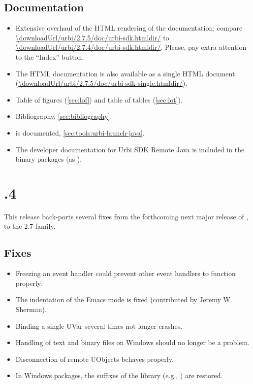 \subsection{Documentation}
\begin{itemize}
\item Extensive overhaul of the HTML rendering of the documentation; compare
  \url{\downloadUrl/urbi/2.7.5/doc/urbi-sdk.htmldir/} to
  \url{\downloadUrl/urbi/2.7.4/doc/urbi-sdk.htmldir/}.  Please, pay extra
  attention to the ``Index'' button.
\item The HTML documentation is also available as a single HTML document
  (\url{\downloadUrl/urbi/2.7.5/doc/urbi-sdk-single.htmldir/}).
\item Table of figures (\autoref{sec:lof}) and table of tables
  (\autoref{sec:lot}).
\item Bibliography, \autoref{sec:bibliography}.
\item {} is documented,
  \autoref{sec:tools:urbi-launch-java}.
\item The developer documentation for Urbi SDK Remote Java is included in
  the binary packages (as
  ).
\end{itemize}

\section{.4}

This release back-ports several fixes from the forthcoming next major
release of \urbi, to the 2.7 family.

\subsection{Fixes}
\begin{itemize}
\item Freezing an event handler could prevent other event handlers to
  function properly.
\item The indentation of the Emacs \us mode is fixed (contributed by Jeremy
  W. Sherman).
\item Binding a single UVar several times not longer crashes.
\item Handling of text and binary files on Windows should no longer be a
  problem.
\item Disconnection of remote UObjects behaves properly.
\item In Windows packages, the suffixes of the library (e.g.,
  ) are restored.
\end{itemize}

